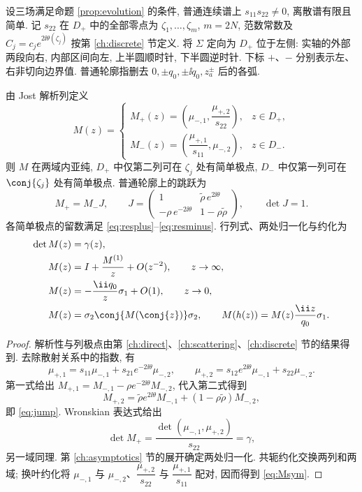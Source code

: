 设三场满足命题 \ref{prop:evolution} 的条件, 普通连续谱上 $s_{11}s_{22}\ne0$, 离散谱有限且简单. 记 $s_{22}$ 在 $D_+$ 中的全部零点为 $\zeta_1,\ldots,\zeta_m$, $m=2N$, 范数常数及 $C_j=c_je^{2\ii\theta(\zeta_j)}$ 按第 \ref{ch:discrete} 节定义. 将 $\Sigma$ 定向为 $D_+$ 位于左侧: 实轴的外部两段向右, 内部区间向左, 上半圆顺时针, 下半圆逆时针. 下标 $+$、$-$ 分别表示左、右非切向边界值. 普通轮廓指删去 $0,\pm q_0,\pm\ii q_0,z_a^\pm$ 后的各弧.

\begin{theorem}\label{thm:RHP}\label{prop:jump}
由 Jost 解析列定义
\begin{equation}\label{eq:Mdef}
M(z)=\begin{cases}
M_+(z)=\left(\mu_{-,1},\dfrac{\mu_{+,2}}{s_{22}}\right),&z\in D_+,\\[6pt]
M_-(z)=\left(\dfrac{\mu_{+,1}}{s_{11}},\mu_{-,2}\right),&z\in D_-.
\end{cases}
\end{equation}
则 $M$ 在两域内亚纯, $D_+$ 中仅第二列可在 $\zeta_j$ 处有简单极点, $D_-$ 中仅第一列可在 $\conj{\zeta_j}$ 处有简单极点. 普通轮廓上的跳跃为
\begin{equation}\label{eq:jump}
M_+=M_-J,\qquad
J=\begin{pmatrix}
1&\widetilde\rho\,e^{2\ii\theta}\\
-\rho\,e^{-2\ii\theta}&1-\rho\widetilde\rho
\end{pmatrix},\qquad \det J=1.
\end{equation}
各简单极点的留数满足 \eqref{eq:resplus}--\eqref{eq:resminus}. 行列式、两处归一化与约化为
\begin{align}
\det M(z)&=\gamma(z),\label{eq:detM}\\
M(z)&=I+\dfrac{M^{(1)}}{z}+O(z^{-2}),\qquad z\to\infty,\label{eq:Minfty}\\
M(z)&=-\dfrac{\ii q_0}{z}\sigma_1+O(1),\qquad z\to0,\label{eq:Mzero}\\
M(z)&=\sigma_2\conj{M(\conj{z})}\sigma_2,\qquad
M(h(z))=M(z)\dfrac{\ii z}{q_0}\sigma_1.\label{eq:Msym}
\end{align}
\end{theorem}
\begin{proof}
解析性与列极点由第 \ref{ch:direct}、\ref{ch:scattering}、\ref{ch:discrete} 节的结果得到. 去除散射关系中的指数, 有
\[
\mu_{+,1}=s_{11}\mu_{-,1}+s_{21}e^{-2\ii\theta}\mu_{-,2},\qquad
\mu_{+,2}=s_{12}e^{2\ii\theta}\mu_{-,1}+s_{22}\mu_{-,2}.
\]
第一式给出 $M_{+,1}=M_{-,1}-\rho e^{-2\ii\theta}M_{-,2}$, 代入第二式得到
\[
M_{+,2}=\widetilde\rho e^{2\ii\theta}M_{-,1}+(1-\rho\widetilde\rho)M_{-,2},
\]
即 \eqref{eq:jump}. Wronskian 表达式给出
\[
\det M_+=\dfrac{\det(\mu_{-,1},\mu_{+,2})}{s_{22}}=\gamma,
\]
另一域同理. 第 \ref{ch:asymptotics} 节的展开确定两处归一化. 共轭约化交换两列和两域; 换叶约化将 $\mu_{-,1}$ 与 $\mu_{-,2}$、$\dfrac{\mu_{+,2}}{s_{22}}$ 与 $\dfrac{\mu_{+,1}}{s_{11}}$ 配对, 因而得到 \eqref{eq:Msym}.
\end{proof}

